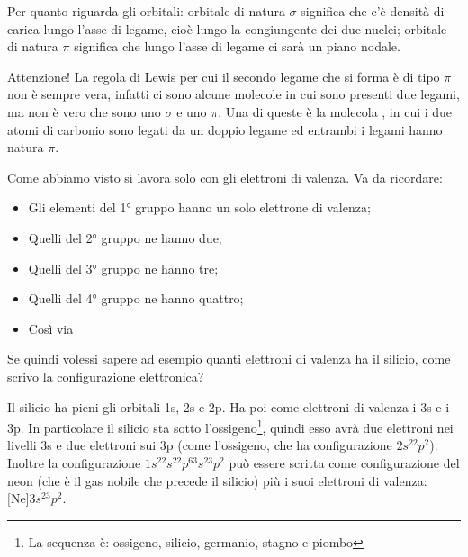 Per quanto riguarda gli orbitali: orbitale di natura $\sigma$ significa che c'è densità di carica lungo l'asse di legame, cioè lungo la congiungente dei due nuclei; orbitale di natura $\pi$ significa che lungo l'asse di legame ci sarà un piano nodale.

Attenzione! La regola di Lewis per cui il secondo legame che si forma è di tipo $\pi$ non è sempre vera, infatti ci sono alcune molecole in cui sono presenti due legami, ma non è vero che sono uno $\sigma$ e uno $\pi$. Una di queste è la molecola , in cui i due atomi di carbonio sono legati da un doppio legame ed entrambi i legami hanno natura $\pi$.

Come abbiamo visto si lavora solo con gli elettroni di valenza. Va da ricordare:
\begin{itemize}
    \item Gli elementi del 1° gruppo hanno un solo elettrone di valenza;
    \item Quelli del 2° gruppo ne hanno due;
    \item Quelli del 3° gruppo ne hanno tre;
    \item Quelli del 4° gruppo ne hanno quattro;
    \item Così via
\end{itemize}

Se quindi volessi sapere ad esempio quanti elettroni di valenza ha il silicio, come scrivo la configurazione elettronica?

Il silicio ha pieni gli orbitali 1s, 2s e 2p. Ha poi come elettroni di valenza i 3s e i 3p. In particolare il silicio sta sotto l'ossigeno\footnote{La sequenza è: ossigeno, silicio, germanio, stagno e piombo}, quindi esso avrà due elettroni nei livelli 3s e due elettroni sui 3p (come l'ossigeno, che ha configurazione $2s^22p^2$). Inoltre la configurazione $1s^22s^22p^63s^23p^2$ può essere scritta come configurazione del neon (che è il gas nobile che precede il silicio) più i suoi elettroni di valenza: $\text{[Ne]}3s^23p^2$.
